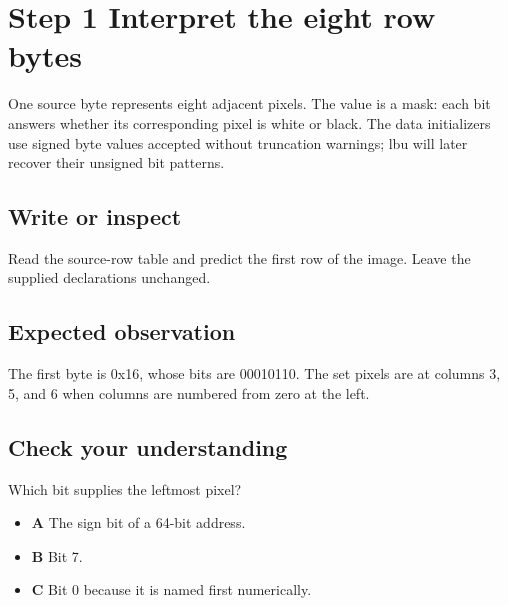 \section{Step 1 Interpret the eight row
  bytes}\label{003-eight-byte-sprite-s01-step-1-interpret-the-eight-row-bytes}

One source byte represents eight adjacent pixels. The value is a mask:
each bit answers whether its corresponding pixel is white or black. The
data initializers use signed byte values accepted without truncation
warnings; lbu will later recover their unsigned bit patterns.

\subsection{Write or
  inspect}\label{003-eight-byte-sprite-s01-write-or-inspect}

Read the source-row table and predict the first row of the image. Leave
the supplied declarations unchanged.

\subsection{Expected
  observation}\label{003-eight-byte-sprite-s01-expected-observation}

The first byte is 0x16, whose bits are 00010110. The set pixels are at
columns 3, 5, and 6 when columns are numbered from zero at the left.

\subsection{Check your
  understanding}\label{003-eight-byte-sprite-s01-check-your-understanding}

Which bit supplies the leftmost pixel?

\begin{itemize}
  \tightlist
  \item
        \textbf{A} The sign bit of a 64-bit address.
  \item
        \textbf{B} Bit 7.
  \item
        \textbf{C} Bit 0 because it is named first numerically.
\end{itemize}
